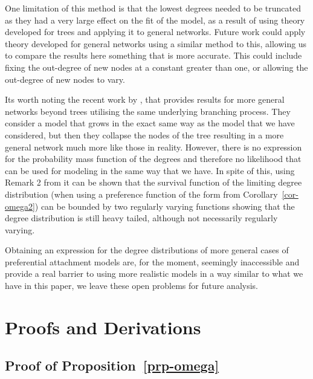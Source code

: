 \documentclass[
  sn-basic,
]{sn-jnl}
\theoremstyle{plain}
\theoremstyle{plain}
\theoremstyle{remark}
\begin{document}
One limitation of this method is that the lowest degrees needed to be
truncated as they had a very large effect on the fit of the model, as a
result of using theory developed for trees and applying it to general
networks. Future work could apply theory developed for general networks
using a similar method to this, allowing us to compare the results here
something that is more accurate. This could include fixing the
out-degree of new nodes at a constant greater than one, or allowing the
out-degree of new nodes to vary.

Its worth noting the recent work by \citet{banerjee25}, that provides
results for more general networks beyond trees utilising the same
underlying branching process. They consider a model that grows in the
exact same way as the model that we have considered, but then they
collapse the nodes of the tree resulting in a more general network much
more like those in reality. However, there is no expression for the
probability mass function of the degrees and therefore no likelihood
that can be used for modeling in the same way that we have. In spite of
this, using Remark 2 from \citet{banerjee25} it can be shown that the
survival function of the limiting degree distribution (when using a
preference function of the form from Corollary~\ref{cor-omega2}) can be
bounded by two regularly varying functions showing that the degree
distribution is still heavy tailed, although not necessarily regularly
varying.

Obtaining an expression for the degree distributions of more general
cases of preferential attachment models are, for the moment, seemingly
inaccessible and provide a real barrier to using more realistic models
in a way similar to what we have in this paper, we leave these open
problems for future analysis.

\setcounter{section}{0}
\renewcommand{\thesection}{\Alph{section}}
\setcounter{table}{0}
\renewcommand{\thetable}{A\arabic{table}}
\setcounter{figure}{0}
\renewcommand{\thefigure}{A\arabic{figure}}

\newpage

\section{Proofs and Derivations}\label{sec-proofs}

\subsection{\texorpdfstring{Proof of
Proposition~\ref{prp-omega}}{Proof of Proposition~}}\label{proof-of-prp-omega}
\end{document}
